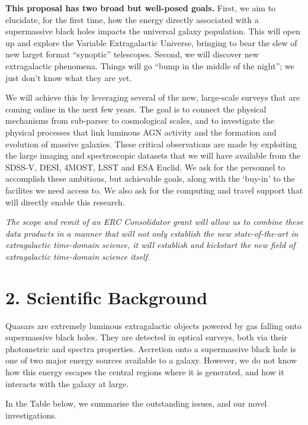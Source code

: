 \documentclass[oneside, a4paper, onecolumn, 11pt]{article}
\begin{document}
\smallskip
\smallskip
\noindent
{\bf This proposal has two broad but well-posed goals.}
First, we aim to elucidate, for the first time, how the energy
directly associated with a supermassive black holes impacts the
universal galaxy population.  This will open up and explore the
Variable Extragalactic Universe, bringing to bear the slew of new
larget format ``synoptic'' telescopes.
Second, we will discover new extragalactic phenomena. 
Things will go ``bump in the middle of the night''; we
just don't know what they are yet. 

\smallskip
\smallskip
\noindent
We will achieve this by leveraging several of the new, large-scale
surveys that are coming online in the next few years.
The goal is to connect the physical mechanisms from sub-parsec to
cosmological scales, and to investigate the physical processes that
link luminous AGN activity and the formation and evolution of massive
galaxies. These critical observations are made by exploiting the large
imaging and spectroscopic datasets that we will have available from
the SDSS-V, DESI, 4MOST, LSST and ESA Euclid.
We ask for the personnel to accomplish these ambitious, but
achievable goals, along with the `buy-in' to the facilites we need
access to.  We also ask for the computing and travel support that will
directly enable this research.

\smallskip
\smallskip
\noindent
{\it The scope and
remit of an ERC Consolidator grant will allow us to combine these data
products in a manner that will not only establish the new
state-of-the-art in extragalactic time-domain science, it will
establish and kickstart the new field of extragalactic time-domain 
science itself.}


\noindent
\section*{\textcolor{Cerulean}{2. Scientific Background}}
\vspace{-8pt}
Quasars are extremely luminous extragalactic objects powered by gas
falling onto supermassive black holes.  They are detected in optical
surveys, both via their photometric and spectra properties.  Accretion
onto a supermassive black hole is one of two major energy sources
available to a galaxy.  However, we do not know how this energy
escapes the central regions where it is generated, and how it
interacts with the galaxy at large.

\smallskip
\smallskip
\noindent
In the Table below, we summarise the outstanding issues, and our novel investigations. 
\end{document}
